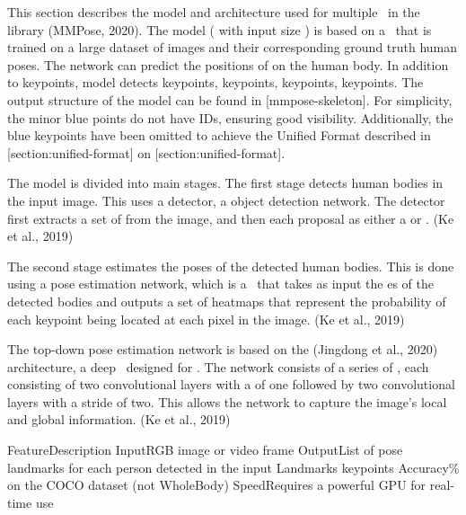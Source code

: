 
This section describes the model and architecture used for multiple \HPE\ in the  library (\scc MMPose, 2020). The model ( with input size ) is based on a \CNN\ that is trained on a large dataset of images and their corresponding ground truth human poses. The network can predict the positions of  on the human body. In addition to  keypoints, model detects  keypoints,  keypoints,  keypoints,  keypoints. The output structure of the  model can be found in [mmpose-skeleton]. For simplicity, the minor blue points do not have IDs, ensuring good visibility. Additionally, the blue keypoints have been omitted to achieve the Unified Format described in [section:unified-format] on [section:unified-format].

The model is divided into  main stages. The first stage detects human bodies in the input image. This uses a  detector, a  object detection network. The detector first extracts a set of  from the image, and then  each proposal as either a  or . (\scc Ke et al., 2019)

The second stage estimates the poses of the detected human bodies. This is done using a  pose estimation network, which is a \CNN\ that takes as input the \BBOX\-es of the detected bodies and outputs a set of heatmaps that represent the probability of each keypoint being located at each pixel in the image. (\scc Ke et al., 2019)

The top-down pose estimation network is based on the  (\scc Jingdong et al., 2020) architecture, a deep \CNN\ designed for \HPE. The network consists of a series of , each consisting of two convolutional layers with a  of one followed by two convolutional layers with a stride of two. This allows the network to capture the image's local and global information. (\scc Ke et al., 2019)

 \setupTABLE[r][1][style=bold]
 \setupTABLE[c][each][offset=3dd]
 \setupTABLE[frame=off]
 \setupTABLE[r][1][topframe=on,bottomframe=on]
 \setupTABLE[r][6][bottomframe=on]
 \setupTABLE[c][each][leftframe=on]
 \setupTABLE[c][1][leftframe=off]
 \bTR\bTD Feature\eTD\bTD Description\eTD\eTR
 \bTR\bTD Input\eTD\bTD RGB image or video frame\eTD\eTR
 \bTR\bTD Output\eTD\bTD List of pose landmarks for each person detected in the input\eTD\eTR
 \bTR\bTD Landmarks\eTD{} keypoints\eTD\eTR
 \bTR\bTD Accuracy\eTD{}\% on the COCO dataset (not WholeBody)\eTD\eTR
 \bTR\bTD Speed\eTD\bTD Requires a powerful GPU for real-time use\eTD\eTR

